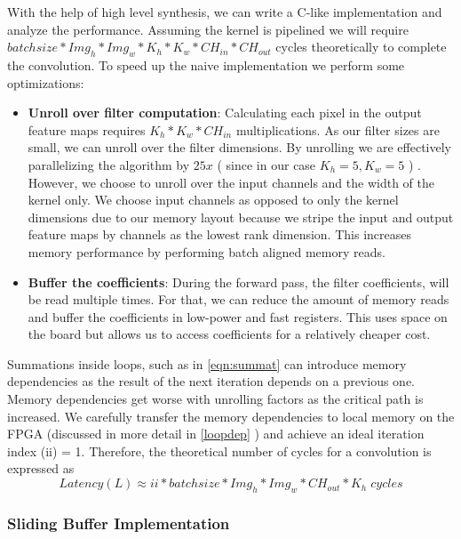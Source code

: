 With the help of high level synthesis, we can write a C-like implementation and analyze the performance. Assuming the kernel is pipelined we will require $ batch size * Img_h * Img_w * K_h * K_w * CH_{in} * CH_{out}  $ cycles theoretically to complete the convolution. To speed up the naive implementation we perform some optimizations:

\begin{itemize}
\item
\textbf{Unroll over filter computation}: Calculating each pixel in the output feature maps requires $ K_h * K_w * CH_{in} $ multiplications. As our filter sizes are small, we can unroll over the filter dimensions. By unrolling we are effectively parallelizing the algorithm by $ \mathit{25x} $ ( since in our case $ K_h = 5, K_w=5 $ ) . However, we choose to unroll over the input channels and the width of the kernel only. We choose input channels as opposed to only the kernel dimensions due to our memory layout because we stripe the input and  output feature maps by channels as the lowest rank dimension. This increases memory performance by performing batch aligned memory reads. 

\item
\textbf{Buffer the coefficients}: During the forward pass, the filter coefficients, will be read multiple times.  For that, we can reduce the amount of memory reads and buffer the coefficients in low-power and fast registers. This uses space on the board but allows us to access coefficients for a relatively cheaper cost.
\end{itemize}

Summations inside loops, such as in \ref{eqn:summat} can introduce memory dependencies as the result of the next iteration depends on a previous one. Memory dependencies get worse with unrolling factors as the critical path is increased. We carefully transfer the memory dependencies to local memory on the FPGA (discussed in more detail in \ref{loopdep} ) and achieve an ideal iteration index (ii) = 1. Therefore, the theoretical number of cycles for a convolution is expressed as 
\begin{equation}
Latency (L)  \approx ii * batch size * Img_h * Img_w * CH_{out} * K_h  \; cycles
\end{equation}




\subsubsection{Sliding Buffer Implementation} \label{slidingimpl}

